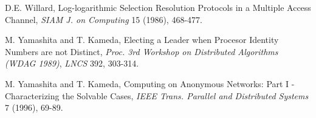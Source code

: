 \documentclass[11pt]{article}
\begin{document}
\begin{thebibliography}{12}
D.E. Willard, 
Log-logarithmic Selection Resolution Protocols in a Multiple Access Channel,
{\em SIAM J. on Computing} 15 (1986), 468-477. 


M. Yamashita and T. Kameda,
Electing a Leader when Procesor Identity Numbers are not Distinct,
{\em Proc. 3rd Workshop on Distributed Algorithms (WDAG 1989)},
{\em LNCS} 392, 303-314.

M. Yamashita and T. Kameda,
Computing on Anonymous Networks: Part I - Characterizing the Solvable Cases,
{\em IEEE Trans. Parallel and Distributed Systems} 7 (1996), 69-89. 









\end{thebibliography}
\end{document}
